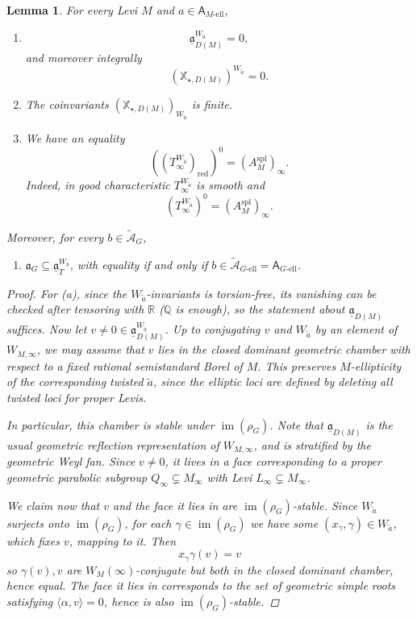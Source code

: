 \documentclass[openany]{amsbook}
\newtheorem{lemma}[theorem]{Lemma}
\theoremstyle{definition}
\theoremstyle{remark}
\numberwithin{equation}{section}
\newcommand{\R}{\mathbb{R}}
\newcommand{\Q}{\mathbb{Q}}
\newcommand{\cA}{\mathcal{A}}
\newcommand{\red}{\mathrm{red}}
\newcommand{\im}{\operatorname{im}}
\newcommand{\ul}[1]{\underline{#1}}
\renewcommand{\-}{\operatorname{-}}
\renewcommand{\a}{\mathfrak{a}}
\newcommand{\wtilde}[1]{\widetilde{#1}}
\newcommand{\el}{\text{-ell}}
\newcommand{\ctA}{\widetilde{\cA}}
\newcommand{\bA}{\mathsf{A}}
\newcommand{\bX}{\mathbb{X}}
\newcommand{\bAe}[1]{\bA_{#1\el}}
\newcommand{\spl}{\mathrm{spl}}
\newcommand{\Gell}{G\text{-ell}}
\newcommand{\ga}{\ul{\a}}
\begin{document}
\begin{lemma}\label{lem.monodr.inv.spl.torus}
For every Levi $M$ and $a \in \bAe{M}$, 
\begin{enumerate}[label=(\alph*)]
    \item $$
    \ga_{D(M)}^{W_{\wtilde{a}}} = 0,
$$
and moreover integrally
$$
    (\bX_{\star,D(M)})^{W_{\wtilde{a}}} = 0.
$$
\item The coinvariants $(\bX_{\star,D(M)})_{W_{\wtilde{a}}}$ is finite.
\item We have an equality
$$
    ((T_\infty^{W_{\wtilde{a}}})_{\red})^0 = (A_M^\spl)_\infty.
$$
Indeed, in good characteristic $T_{\infty}^{W_{\wtilde{a}}}$ is smooth and
$$
    (T_\infty^{W_{\wtilde{a}}})^0 = (A_M^\spl)_\infty.
$$
\end{enumerate}
Moreover, for every $b \in \ctA_G$,
\begin{enumerate}[label=(\alph*), start=4]
    \item $\a_G \subseteq \ga_T^{W_b}$, with equality if and only if $b \in \ctA_{\Gell} = \bAe{G}$.
\end{enumerate}

\begin{proof}
    For (a), since the $W_{\wtilde{a}}$-invariants is torsion-free, its vanishing can be checked after tensoring with $\R$ ($\Q$ is enough), so the statement about $\ga_{D(M)}$ suffices. Now let $v \neq 0 \in \ga_{D(M)}^{W_{\wtilde{a}}}$. Up to conjugating $v$ and $W_{\wtilde{a}}$ by an element of $W_{M, \infty}$, we may assume that $v$ lies in the closed dominant geometric chamber with respect to a fixed rational semistandard Borel of $M$. This preserves $M$-ellipticity of the corresponding twisted $\wtilde{a}$, since the elliptic loci are defined by deleting all \textit{twisted} loci for proper Levis.
    
    In particular, this chamber is stable under $\im(\rho_G)$. Note that $\ga_{D(M)}$ is the usual geometric reflection representation of $W_{M, \infty}$, and is stratified by the geometric Weyl fan. Since $v \neq 0$, it lives in a face corresponding to a proper geometric parabolic subgroup $Q_\infty \subsetneq M_\infty$ with Levi $L_\infty \subsetneq M_\infty$. 

    We claim now that $v$ and the face it lies in are $\im(\rho_G)$-stable. Since $W_{\wtilde{a}}$ surjects onto $\im(\rho_G)$, for each $\gamma \in \im(\rho_G)$ we have some $(x_\gamma, \gamma) \in W_{\wtilde{a}}$, which fixes $v$, mapping to it. Then
    $$
        x_\gamma \gamma(v) = v
    $$
    so $\gamma(v), v$ are $W_M(\infty)$-conjugate but both in the closed dominant chamber, hence \textit{equal}. The face it lies in corresponds to the set of geometric simple roots satisfying $\langle \alpha, v\rangle = 0$, hence is also $\im(\rho_G)$-stable.
    

\end{proof}
\end{lemma}
\end{document}
